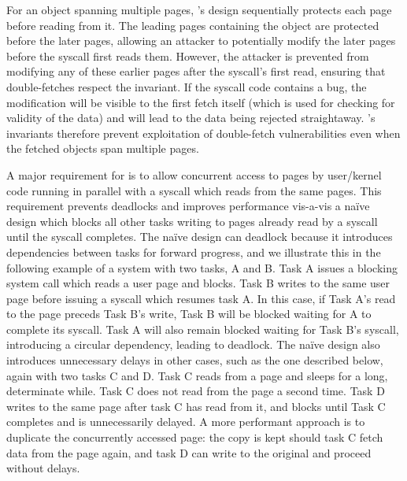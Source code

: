 \documentclass[letterpaper,twocolumn,10pt, anonymous]{article}
\begin{document}
For an object spanning multiple pages, \tiktok's design sequentially 
protects each page before reading from it.
The leading pages containing the object are protected before the
later pages, allowing an attacker to potentially modify the later 
pages before the syscall first reads them.
However, the attacker is prevented from modifying any of these earlier pages
after the syscall's first read, ensuring that double-fetches respect
the invariant.
If the syscall code contains a \tocttou bug, the modification will
be visible to the first fetch itself (which is used for checking for 
validity of the data) and will lead to the data being rejected 
straightaway.
\tiktok's invariants therefore prevent exploitation of double-fetch
vulnerabilities even when the fetched objects span multiple pages.

A major requirement for \tiktok is to allow concurrent access to pages
by user/kernel code running in parallel with a syscall which reads from 
the same pages.
This requirement prevents deadlocks and improves performance vis-a-vis
a na\"ive design which blocks all other tasks writing to pages already 
read by a syscall until the syscall completes.
The na\"ive design can deadlock because it introduces dependencies between
tasks for forward progress, and we illustrate this in the following example
of a system with two tasks, A and B.
Task A issues a blocking system call which reads a user page and blocks. 
Task B writes to the same user page before issuing a syscall which 
resumes task A. 
In this case, if Task A's read to the page preceds Task B's write, 
Task B will be blocked waiting for A to complete its syscall.
Task A will also remain blocked waiting for Task B's syscall, 
introducing a circular dependency, leading to deadlock.
The na\"ive design also introduces unnecessary delays in other cases, 
such as the one described below, again with two tasks C and D.
Task C reads from a page and sleeps for a long, determinate while.
Task C does not read from the page a second time.
Task D writes to the same page after task C has read from it, and 
blocks until Task C completes and is unnecessarily delayed.
A more performant approach is to duplicate the concurrently accessed page: the copy is 
kept should task C fetch data from the page again, and task D
can write to the original and proceed without delays.
\end{document}
